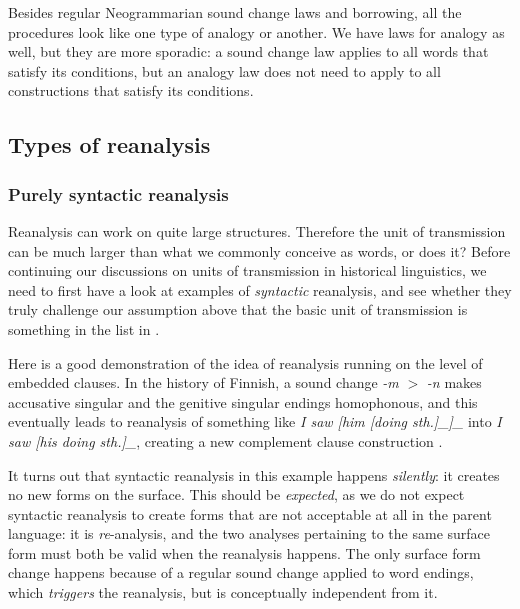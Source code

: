 \documentclass[a4paper, oneside, scheme=plain, 12pt]{article}
\newcommand*{\citepages}[1]{pp.~{#1}}
\newcommand{\form}[1]{\emph{#1}}
\newcommand*{\textgt}{$>$ }
\begin{document}
Besides regular Neogrammarian sound change laws and borrowing,
all the procedures look like one type of analogy or another.
We have laws for analogy as well, but they are more sporadic:
a sound change law applies to all words that satisfy its conditions,
but an analogy law does not need to apply to all constructions that satisfy its conditions.


\subsection{Types of reanalysis}\label{sec:reanalysis}

\subsubsection{Purely syntactic reanalysis}\label{sec:syntactic-reanalysis}

Reanalysis can work on quite large structures.
Therefore the unit of transmission can be much larger than what we commonly conceive as words, or does it?
Before continuing our discussions on units of transmission in historical linguistics,
we need to first have a look at examples of \emph{syntactic} reanalysis,
and see whether they truly challenge our assumption above that
the basic unit of transmission is something in the list in .

Here is a good demonstration of the idea of reanalysis running on the level of embedded clauses.
In the history of Finnish, a sound change \form{-m} \textgt \form{-n} makes accusative singular and the genitive singular endings homophonous,
and this eventually leads to reanalysis of something like \form{I saw [him [doing sth.]_{}]_{\text{object: noun phrase}}} into 
\form{I saw [his doing sth.]_{}},
creating a new complement clause construction
\citep[\citepages{275-276}]{campbell2013historical}.

It turns out that syntactic reanalysis in this example happens \emph{silently}:
it creates no new forms on the surface. 
This should be \emph{expected}, as we do not expect syntactic reanalysis to create forms 
that are not acceptable at all in the parent language:
it is \emph{re}-analysis, and the two analyses pertaining to the same surface form
must both be valid when the reanalysis happens.
The only surface form change happens because of a regular sound change applied to word endings,
which \emph{triggers} the reanalysis, but is conceptually independent from it.
\end{document}
